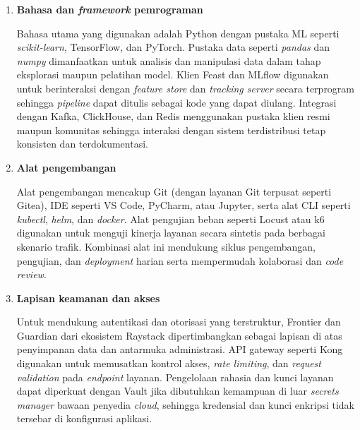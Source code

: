 \begin{enumerate}
    \vspace{0.5em}
    
    \item \textbf{Bahasa dan \textit{framework} pemrograman}
    
    Bahasa utama yang digunakan adalah Python dengan pustaka ML seperti \textit{scikit-learn}, TensorFlow, dan PyTorch. Pustaka data seperti \textit{pandas} dan \textit{numpy} dimanfaatkan untuk analisis dan manipulasi data dalam tahap eksplorasi maupun pelatihan model. Klien Feast dan MLflow digunakan untuk berinteraksi dengan \textit{feature store} dan \textit{tracking server} secara terprogram sehingga \textit{pipeline} dapat ditulis sebagai kode yang dapat diulang. Integrasi dengan Kafka, ClickHouse, dan Redis menggunakan pustaka klien resmi maupun komunitas sehingga interaksi dengan sistem terdistribusi tetap konsisten dan terdokumentasi.
    
    \vspace{0.5em}
    
    \item \textbf{Alat pengembangan}
    
    Alat pengembangan mencakup Git (dengan layanan Git terpusat seperti Gitea), IDE seperti VS Code, PyCharm, atau Jupyter, serta alat CLI seperti \textit{kubectl}, \textit{helm}, dan \textit{docker}. Alat pengujian beban seperti Locust atau k6 digunakan untuk menguji kinerja layanan secara sintetis pada berbagai skenario trafik. Kombinasi alat ini mendukung siklus pengembangan, pengujian, dan \textit{deployment} harian serta mempermudah kolaborasi dan \textit{code review}.
    
    \vspace{0.5em}
    
    \item \textbf{Lapisan keamanan dan akses}
    
    Untuk mendukung autentikasi dan otorisasi yang terstruktur, Frontier dan Guardian dari ekosistem Raystack dipertimbangkan sebagai lapisan di atas penyimpanan data dan antarmuka administrasi. API gateway seperti Kong digunakan untuk memusatkan kontrol akses, \textit{rate limiting}, dan \textit{request validation} pada \textit{endpoint} layanan. Pengelolaan rahasia dan kunci layanan dapat diperkuat dengan Vault jika dibutuhkan kemampuan di luar \textit{secrets manager} bawaan penyedia \textit{cloud}, sehingga kredensial dan kunci enkripsi tidak tersebar di konfigurasi aplikasi.
    
    \vspace{0.5em}
    

\end{enumerate}
